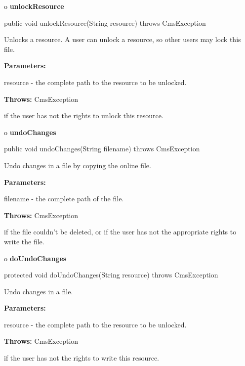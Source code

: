 o {\bf unlockResource} 

\begin{PRE}
 public void unlockResource(String resource) throws CmsException
\end{PRE}

\begin{description}
\htmlDD Unlocks a resource. \htmlBR
A user can unlock a resource, so other users may lock this file. 

\begin{description}
\item {\bf Parameters:}  

resource - the complete path to the resource to be unlocked.  
\item {\bf Throws:} CmsException  

if the user has not the rights to unlock this resource.  
\end{description}

\end{description}

o {\bf undoChanges} 

\begin{PRE}
 public void undoChanges(String filename) throws CmsException
\end{PRE}

\begin{description}
\htmlDD Undo changes in a file by copying the online file. 

\begin{description}
\item {\bf Parameters:}  

filename - the complete path of the file.  
\item {\bf Throws:} CmsException  

if the file couldn't be deleted, or if the user has not the appropriate rights
to write the file.  
\end{description}

\end{description}

o {\bf doUndoChanges} 

\begin{PRE}
 protected void doUndoChanges(String resource) throws CmsException
\end{PRE}

\begin{description}
\htmlDD Undo changes in a file. \htmlBR

\begin{description}
\item {\bf Parameters:}  

resource - the complete path to the resource to be unlocked.  
\item {\bf Throws:} CmsException  

if the user has not the rights to write this resource.  
\end{description}

\end{description}

